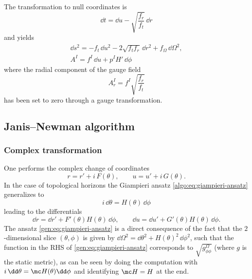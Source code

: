 The transformation to null coordinates is
\begin{equation}
	\label{gen:eq:change:null}
	\dd t = \dd u - \sqrt{\frac{f_r}{f_t}}\, \dd r
\end{equation} 
and yields
\begin{subequations}
\label{gen:eq:static:ur}
\begin{gather}
	\label{gen:eq:static:metric:ur}
	\dd s^2 = - f_t\, \dd u^2 - 2 \sqrt{f_t f_r}\, \dd r^2 + f_\Omega\, \dd\Omega^2, \\
	A^I = f^I\, \dd u + p^I H'\, \dd\phi
\end{gather}
\end{subequations}
where the radial component of the gauge field
\begin{equation}
	A^I_r = f^I \sqrt{\frac{f_r}{f_t}}
\end{equation} 
has been set to zero through a gauge transformation.


\subsection{Janis--Newman algorithm}
\label{sec:general:jna}


\subsubsection{Complex transformation}


One performs the complex change of coordinates
\begin{equation}
	\label{gen:eq:change:jna}
	r = r' + i\, F(\theta), \qquad
	u = u' + i\, G(\theta).
\end{equation}
In the case of topological horizons the Giampieri ansatz \eqref{algo:eq:giampieri-ansatz} generalizes to
\begin{equation}
	\label{gen:eq:giampieri-ansatz}
	i\, \dd \theta = H(\theta)\, \dd \phi
\end{equation} 
leading to the differentials
\begin{equation}
	\dd r = \dd r' + F'(\theta) H(\theta)\, \dd \phi, \qquad
	\dd u = \dd u' + G'(\theta) H(\theta)\, \dd \phi.
\end{equation} 
The ansatz \eqref{gen:eq:giampieri-ansatz} is a direct consequence of the fact that the $2$-dimensional slice $(\theta, \phi)$ is given by $\dd \Omega^2 = \dd\theta^2 + H(\theta)^2\, \dd \phi^2$, such that the function in the RHS of \eqref{gen:eq:giampieri-ansatz} corresponds to $\sqrt{g^\Omega_{\phi\phi}}$ (where $g$ is the static metric), as can be seen by doing the computation with $i\, \dd \theta = \mc H(\theta) \dd\phi$ and identifying $\mc H = H$ at the end.

